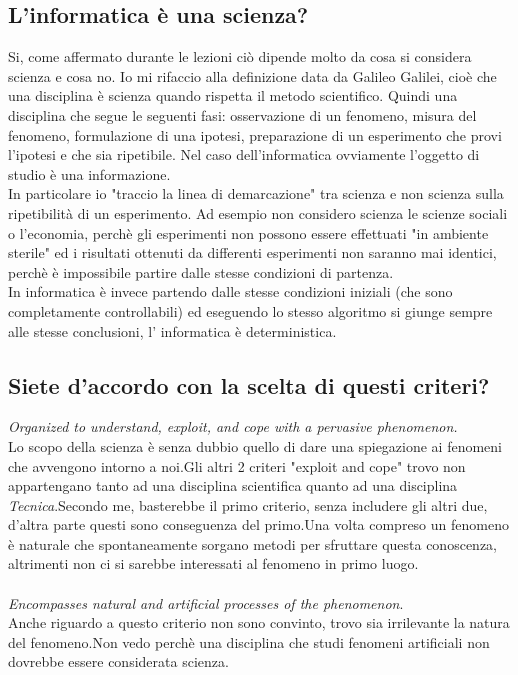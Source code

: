 \documentclass[a4paper]{article}
\begin{document}
\subsection{L’informatica è una scienza?}
\label{sec:Q2}
Si, come affermato durante le lezioni ciò dipende molto da cosa si considera scienza e cosa no.
Io mi rifaccio alla definizione data da Galileo Galilei, cioè che una disciplina è scienza quando rispetta il metodo scientifico.
Quindi una disciplina che segue le seguenti fasi: osservazione di un fenomeno, misura del fenomeno, formulazione di una ipotesi, preparazione di un esperimento che provi l'ipotesi e che sia ripetibile. Nel caso dell'informatica ovviamente l'oggetto di studio è una informazione.\\
In particolare io "traccio la linea di demarcazione" tra scienza e non scienza sulla ripetibilità di un esperimento. Ad esempio non considero scienza le scienze sociali o l'economia, perchè gli esperimenti non possono essere effettuati "in ambiente sterile" ed i risultati ottenuti da differenti esperimenti non saranno mai identici, perchè è impossibile partire dalle stesse condizioni di partenza.\\
In informatica è invece partendo dalle stesse condizioni iniziali (che sono completamente controllabili) ed eseguendo lo stesso algoritmo si giunge sempre alle stesse conclusioni, l' informatica è deterministica.

\subsection{Siete d’accordo con la scelta di questi criteri?}
\emph{Organized to understand, exploit, and cope with a pervasive phenomenon.}\\
Lo scopo della scienza è senza dubbio quello di dare una spiegazione ai fenomeni che avvengono intorno a noi.Gli altri 2 criteri "exploit and cope" trovo non appartengano tanto ad una disciplina scientifica quanto ad una disciplina \emph{Tecnica}.Secondo me, basterebbe il primo criterio, senza includere gli altri due, d'altra parte questi sono conseguenza del primo.Una volta compreso un fenomeno è naturale che spontaneamente sorgano metodi per sfruttare questa conoscenza, altrimenti non ci si sarebbe interessati al fenomeno in primo luogo.
\\\\

\emph{Encompasses natural and artificial processes of the phenomenon}.\\
Anche riguardo a questo criterio non sono convinto, trovo sia irrilevante la natura del fenomeno.Non vedo perchè una disciplina che studi fenomeni artificiali non dovrebbe essere considerata scienza.
\\\\
\end{document}
